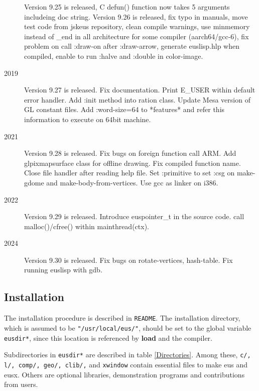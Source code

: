 \begin{description}
            Version 9.25 is released, C defun() function now takes 5 arguments includeing doc string.
            Version 9.26 is released, fix typo in manuals, move test code from jskeus repository, clean compile warnings, use minmemory instead of \_end in all architecture for some compiler (aarch64/gcc-6), fix problem on call :draw-on after :draw-arrow, generate euslisp.hlp when compiled, enable to run :halve and :double in color-image.
\item[2019] Version 9.27 is released. Fix documentation. Print E\_USER within default error handler. Add :init method into ration class. Update Mesa version of GL constant files. Add :word-size=64 to *features* and refer this information to execute on 64bit machine.
\item[2021] Version 9.28 is released. Fix bugs on foreign function call ARM. Add glpixmapsurface class for offline drawing. Fix compiled function name. Close file handler after reading help file. Set :primitive to set :csg on make-gdome and make-body-from-vertices. Use gcc as linker on i386.
\item[2022] Version 9.29 is released. Introduce euspointer\_t in the source code. call malloc()/cfree() within mainthread(ctx).
\item[2024] Version 9.30 is released. Fix bugs on rotate-vertices, hash-table. Fix running euslisp with gdb.
\end{description}

\subsection{Installation}
The installation procedure is described in {\tt README}.
The installation directory, which is assumed to be {\tt "/usr/local/eus/"},
should be set to the global variable 
{\tt *eusdir*}, since this location is referenced
by {\bf load} and the compiler.

Subdirectories in  {\tt *eusdir*} are described in table \ref{Directories}.
Among these, 
{\tt c/, l/, comp/, geo/, clib/,} and {\tt xwindow} contain essential
files to make eus and eusx. Others are optional libraries, demonstration
programs and contributions from users.

